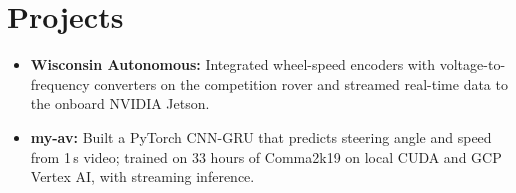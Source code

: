 \documentclass[11pt, letterpaper]{article}
\begin{document}
\section{Projects}
\begin{itemize}
  \item \textbf{Wisconsin Autonomous:} Integrated wheel-speed encoders with voltage-to-frequency converters on the competition rover and streamed real-time data to the onboard NVIDIA Jetson.
  \item \textbf{my-av:} Built a PyTorch CNN-GRU that predicts steering angle and speed from 1\,s video; trained on 33 hours of Comma2k19 on local CUDA and GCP Vertex AI, with streaming inference.
\end{itemize}
\end{document}
